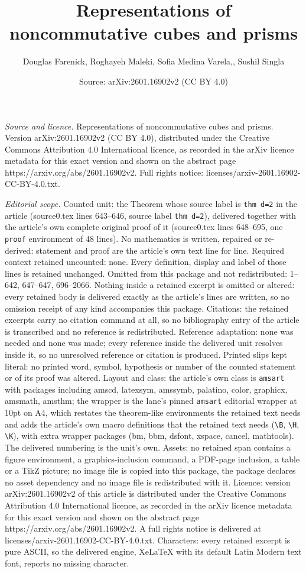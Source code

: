 \documentclass[10pt,a4paper]{amsart}
\title[Representations of noncommutative cubes and prisms]{Representations of noncommutative cubes and prisms}
\author{Douglas Farenick, Roghayeh Maleki, Sofia Medina Varela,, Sushil Singla}
\date{Source: arXiv:2601.16902v2 (CC BY 4.0)}
\begin{document}
\maketitle

\noindent\emph{Source and licence.} Representations of noncommutative cubes and prisms. Version arXiv:2601.16902v2 (CC BY 4.0), distributed under the Creative Commons Attribution 4.0 International licence, as recorded in the arXiv licence metadata for this exact version and shown on the abstract page https://arxiv.org/abs/2601.16902v2. Full rights notice: licenses/arxiv-2601.16902-CC-BY-4.0.txt.\par\smallskip

\noindent\textit{Editorial scope.} Counted unit: the Theorem whose source label is \texttt{thm d=2} in the article (source0.tex lines 643--646, source label \texttt{thm d=2}), delivered together with the article's own complete original proof of it (source0.tex lines 648--695, one \texttt{proof} environment of 48 lines). No mathematics is written, repaired or re-derived: statement and proof are the article's own text line for line. Required context retained uncounted: none. Every definition, display and label of those lines is retained unchanged. Omitted from this package and not redistributed: 1--642, 647--647, 696--2066. Nothing inside a retained excerpt is omitted or altered: every retained body is delivered exactly as the article's lines are written, so no omission receipt of any kind accompanies this package. Citations: the retained excerpts carry no citation command at all, so no bibliography entry of the article is transcribed and no reference is redistributed. Reference adaptation: none was needed and none was made; every reference inside the delivered unit resolves inside it, so no unresolved reference or citation is produced. Printed slips kept literal: no printed word, symbol, hypothesis or number of the counted statement or of its proof was altered. Layout and class: the article's own class is \texttt{amsart} with packages including amscd, latexsym, amssymb, palatino, color, graphicx, amsmath, amsthm; the wrapper is the lane's pinned \texttt{amsart} editorial wrapper at 10pt on A4, which restates the theorem-like environments the retained text needs and adds the article's own macro definitions that the retained text needs (\texttt{\textbackslash B}, \texttt{\textbackslash H}, \texttt{\textbackslash K}), with extra wrapper packages (bm, bbm, dsfont, xspace, cancel, mathtools). The delivered numbering is the unit's own. Assets: no retained span contains a figure environment, a graphics-inclusion command, a PDF-page inclusion, a table or a TikZ picture; no image file is copied into this package, the package declares no asset dependency and no image file is redistributed with it. Licence: version arXiv:2601.16902v2 of this article is distributed under the Creative Commons Attribution 4.0 International licence, as recorded in the arXiv licence metadata for this exact version and shown on the abstract page https://arxiv.org/abs/2601.16902v2. A full rights notice is delivered at licenses/arxiv-2601.16902-CC-BY-4.0.txt. Characters: every retained excerpt is pure ASCII, so the delivered engine, XeLaTeX with its default Latin Modern text font, reports no missing character.
\end{document}
